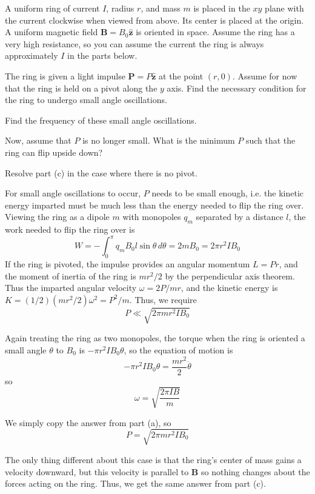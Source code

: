 \documentclass[11pt]{scrartcl}
\begin{document}
\begin{prob}
    A uniform ring of current $I$, radius $r$, and mass $m$ is placed in the $xy$ plane with the current clockwise when viewed from above. Its center is placed at the origin. A uniform magnetic field $\mathbf B=B_0\hat{\mathbf z}$ is oriented in space. Assume the ring has a very high resistance, so you can assume the current the ring is always approximately $I$ in the parts below. \begin{anum}
        \item The ring is given a light impulse $\mathbf P=P\hat{\mathbf z}$ at the point $(r,0)$. Assume for now that the ring is held on a pivot along the $y$ axis. Find the necessary condition for the ring to undergo small angle oscillations. 
        \item Find the frequency of these small angle oscillations. 
        \item Now, assume that $P$ is no longer small. What is the minimum $P$ such that the ring can flip upside down?
        \item Resolve part (c) in the case where there is no pivot.
    \end{anum}
\end{prob}

\begin{sol}
    \begin{anum}
        \item For small angle oscillations to occur, $P$ needs to be small enough, i.e. the kinetic energy imparted must be much less than the energy needed to flip the ring over. Viewing the ring as a dipole $m$ with monopoles $q_m$ separated by a distance $l$, the work needed to flip the ring over is $$W=-\int_0^{\pi}q_mB_0l\sin\theta\, d\theta=2mB_0=2\pi r^2IB_0$$If the ring is pivoted, the impulse provides an angular momentum $L=Pr$, and the moment of inertia of the ring is $mr^2/2$ by the perpendicular axis theorem. Thus the imparted angular velocity $\omega=2P/mr$, and the kinetic energy is $K=(1/2)(mr^2/2)\omega^2=P^2/m$. Thus, we require $$\boxed{P\ll \sqrt{2\pi mr^2IB_0}}$$
        \item Again treating the ring as two monopoles, the torque when the ring is oriented a small angle $\theta$ to $B_0$ is $-\pi r^2IB_0\theta$, so the equation of motion is $$-\pi r^2IB_0\theta=\frac{mr^2}{2}\ddot\theta$$so $$\omega=\boxed{\sqrt{\frac{2\pi IB}{m}}}$$
        \item We simply copy the answer from part (a), so $$\boxed{P=\sqrt{2\pi mr^2IB_0}}$$
        \item The only thing different about this case is that the ring's center of mass gains a velocity downward, but this velocity is parallel to $\mathbf B$ so nothing changes about the forces acting on the ring. Thus, we get the same answer from part (c). 
    \end{anum}
\end{sol}
\end{document}
